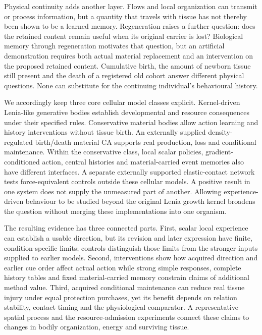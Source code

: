 Physical continuity adds another layer. Flows and local organization can transmit or process information\cite{alimflow,alimsignal,nakajima2015}, but a quantity that travels with tissue has not thereby been shown to be a learned memory. Regeneration raises a further question: does the retained content remain useful when its original carrier is lost? Biological memory through regeneration motivates that question\cite{shomrat}, but an artificial demonstration requires both actual material replacement and an intervention on the proposed retained content. Cumulative birth, the amount of newborn tissue still present and the death of a registered old cohort answer different physical questions. None can substitute for the continuing individual's behavioural history.

We accordingly keep three core cellular model classes explicit. Kernel-driven Lenia-like generative bodies establish developmental and resource consequences under their specified rules. Conservative material bodies allow action learning and history interventions without tissue birth. An externally supplied density-regulated birth/death material CA supports real production, loss and conditional maintenance. Within the conservative class, local scalar policies, gradient-conditioned action, central histories and material-carried event memories also have different interfaces. A separate externally supported elastic-contact network tests force-equivalent controls outside these cellular models. A positive result in one system does not supply the unmeasured part of another. Allowing experience-driven behaviour to be studied beyond the original Lenia growth kernel broadens the question without merging these implementations into one organism.

The resulting evidence has three connected parts. First, scalar local experience can establish a usable direction, but its revision and later expression have finite, condition-specific limits; controls distinguish those limits from the stronger inputs supplied to earlier models. Second, interventions show how acquired direction and earlier cue order affect actual action while strong simple responses, complete history tables and fixed material-carried memory constrain claims of additional method value. Third, acquired conditional maintenance can reduce real tissue injury under equal protection purchases, yet its benefit depends on relation stability, contact timing and the physiological comparator. A representative spatial process and the resource-admission experiments connect these claims to changes in bodily organization, energy and surviving tissue.

